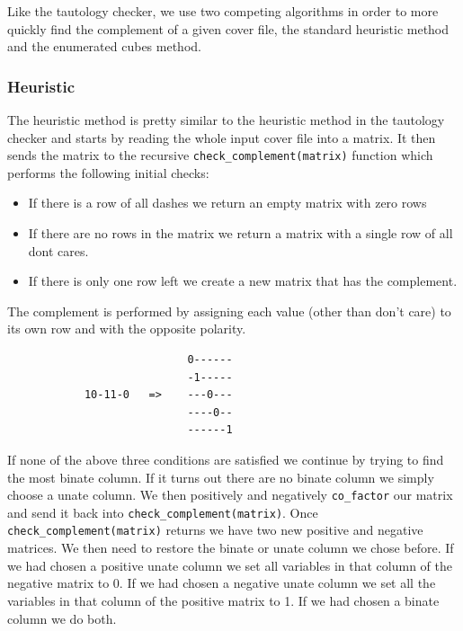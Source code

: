 \documentclass[10pt]{article}
\begin{document}
        Like the tautology checker, we use two competing algorithms in order to
        more quickly find the complement of a given cover file, the standard
        heuristic method and the enumerated cubes method.

        \subsubsection{Heuristic}
            The heuristic method is pretty similar to the heuristic method in the
            tautology checker and starts by reading the whole input cover file into
            a matrix. It then sends the matrix to the recursive
            \texttt{check\_complement(matrix)} function which performs the following
            initial checks:

            \begin{itemize}
                \item If there is a row of all dashes we return an empty matrix with zero rows
                \item If there are no rows in the matrix we return a matrix with a single row of all dont cares.
                \item If there is only one row left we create a new matrix that has the complement.
            \end{itemize}

            The complement is performed by assigning each value (other than don't
            care) to its own row and with the opposite polarity.

            \begin{verbatim}
                            0------
                            -1-----
            10-11-0   =>    ---0---
                            ----0--
                            ------1
            \end{verbatim}

            If none of the above three conditions are satisfied we continue by
            trying to find the most binate column.  If it turns out there are no
            binate column we simply choose a unate column. We then positively and
            negatively \texttt{co\_factor} our matrix and send it back into
            \texttt{check\_complement(matrix)}. Once
            \texttt{check\_complement(matrix)} returns we have two new positive and
            negative matrices. We then need to restore the binate or unate column
            we chose before. If we had chosen a positive unate column we set all
            variables in that column of the negative matrix to 0. If we had chosen
            a negative unate column we set all the variables in that column of the
            positive matrix to 1. If we had chosen a binate column we do both.
\end{document}
